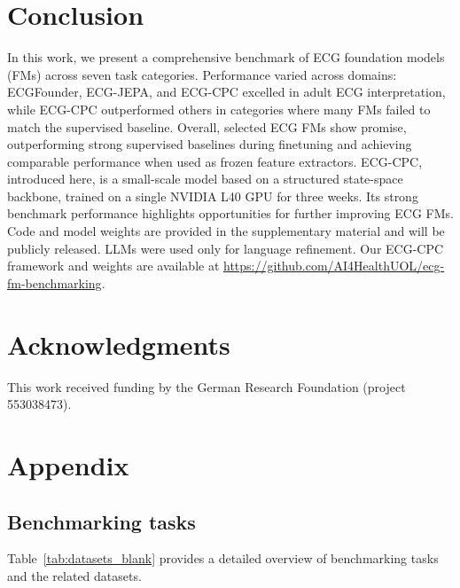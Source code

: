 \documentclass{article}
\begin{document}
    \section{Conclusion}
    In this work, we present a comprehensive benchmark of ECG foundation models (FMs) across seven task categories. Performance varied across domains: ECGFounder, ECG-JEPA, and ECG-CPC excelled in adult ECG interpretation, while ECG-CPC outperformed others in categories where many FMs failed to match the supervised baseline. Overall, selected ECG FMs show promise, outperforming strong supervised baselines during finetuning and achieving comparable performance when used as frozen feature extractors. ECG-CPC, introduced here, is a small-scale model based on a structured state-space backbone, trained on a single NVIDIA L40 GPU for three weeks. Its strong benchmark performance highlights opportunities for further improving ECG FMs. Code and model weights are provided in the supplementary material and will be publicly released. LLMs were used only for language refinement. Our ECG-CPC framework and weights are available at \url{https://github.com/AI4HealthUOL/ecg-fm-benchmarking}.



    \newpage

    \section*{Acknowledgments}
    This work received funding by the German Research Foundation (project 553038473).


    
    



    \newpage


    \appendix
    \section{Appendix}


        \subsection{Benchmarking tasks}
        Table~\ref{tab:datasets_blank} provides a detailed overview of benchmarking tasks and the related datasets.
\end{document}

